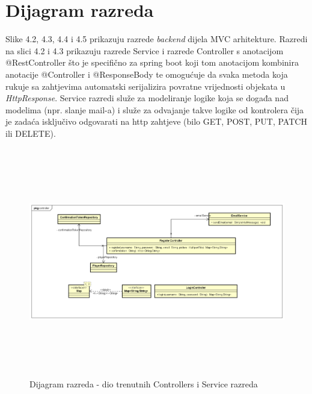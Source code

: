 			\eject
			
			
		\section{Dijagram razreda}
		
			{Slike 4.2, 4.3, 4.4 i 4.5 prikazuju razrede \textit{backend} dijela MVC arhitekture. Razredi na slici 4.2 i 4.3 prikazuju razrede Service i razrede Controller s anotacijom @RestController što je specifično za spring boot koji tom anotacijom kombinira anotacije @Controller i @ResponseBody te omogućuje da svaka metoda koja rukuje sa zahtjevima automatski serijalizira povratne vrijednosti objekata u \textit{HttpResponse}. Service razredi služe za modeliranje logike koja se događa nad modelima (npr. slanje mail-a) i služe za odvajanje takve logike od kontrolera čija je zadaća isključivo odgovarati na http zahtjeve (bilo GET, POST, PUT, PATCH ili DELETE).}
			
			\begin{figure}[H]
				\includegraphics[width=17cm, height=10cm]{dijagrami/servicecontroller_diagram}				
				\centering
				\caption{Dijagram razreda - dio trenutnih Controllers i Service razreda}
				\label{}
			\end{figure}
		

